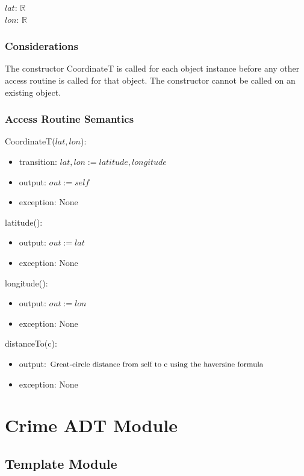 \documentclass[12pt]{article}
\begin{document}
$lat$: $\mathbb{R}$\\
$lon$: $\mathbb{R}$


\subsubsection* {Considerations}

The constructor CoordinateT is called for each object instance before any other
access routine is called for that object.  The constructor cannot be called on
an existing object.

\subsubsection* {Access Routine Semantics}

CoordinateT($lat, lon$):
\begin{itemize}
\item transition: $lat, lon := latitude, longitude$
\item output: $out := \mathit{self}$
\item exception: None
\end{itemize}

\noindent latitude():
\begin{itemize}
\item output: $out := lat$
\item exception: None
\end{itemize}

\noindent longitude():
\begin{itemize}
\item output: $out := lon$
\item exception: None
\end{itemize}

\noindent distanceTo(c):
\begin{itemize}
\item output: $\textnormal{\small{Great-circle distance from self to c using the haversine formula}}$
\item exception: None
\end{itemize}


\newpage


\section* {Crime ADT Module}

\subsection*{Template Module}
\end{document}
